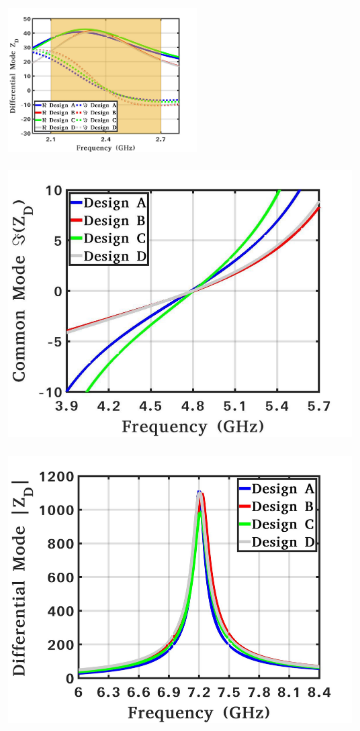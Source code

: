 \documentclass[conference]{IEEEtran}
\begin{document}
\begin{figure}[!t]
	\captionsetup{font=footnotesize}
	\centering
	\begin{subfigure}{0.5\textwidth}
		\centering
		\includegraphics[width=0.55\textwidth]{Images/Output_Network_Comp/Comp_1H.pdf}
		\caption{}
		\label{fig:Comp_1H}
	\end{subfigure}
	\begin{subfigure}{0.24\textwidth}
		\includegraphics[width=1\textwidth]{Images/Output_Network_Comp/Comp_2H_imag.pdf}
		\caption{}
		\label{fig:Comp_2H_imag}
	\end{subfigure}
	\begin{subfigure}{0.24\textwidth}
		\includegraphics[width=1\textwidth]{Images/Output_Network_Comp/Comp_3H_Mag.pdf}

\end{subfigure}
\end{figure}
\end{document}
